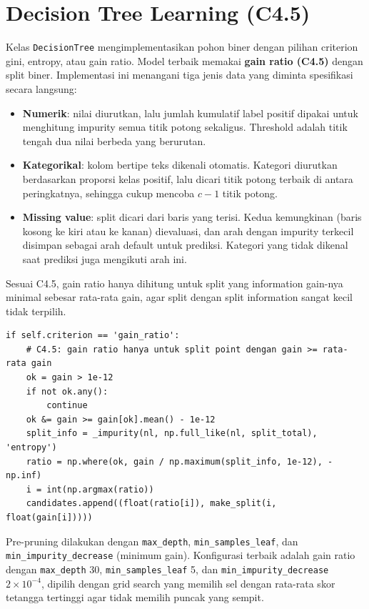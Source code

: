 \section{Decision Tree Learning (C4.5)}
Kelas \texttt{DecisionTree} mengimplementasikan pohon biner dengan pilihan criterion gini, entropy, atau gain ratio. Model terbaik memakai \textbf{gain ratio (C4.5)} dengan split biner. Implementasi ini menangani tiga jenis data yang diminta spesifikasi secara langsung:
\begin{itemize}
  \item \textbf{Numerik}: nilai diurutkan, lalu jumlah kumulatif label positif dipakai untuk menghitung impurity semua titik potong sekaligus. Threshold adalah titik tengah dua nilai berbeda yang berurutan.
  \item \textbf{Kategorikal}: kolom bertipe teks dikenali otomatis. Kategori diurutkan berdasarkan proporsi kelas positif, lalu dicari titik potong terbaik di antara peringkatnya, sehingga cukup mencoba $c-1$ titik potong.
  \item \textbf{Missing value}: split dicari dari baris yang terisi. Kedua kemungkinan (baris kosong ke kiri atau ke kanan) dievaluasi, dan arah dengan impurity terkecil disimpan sebagai arah default untuk prediksi. Kategori yang tidak dikenal saat prediksi juga mengikuti arah ini.
\end{itemize}
Sesuai C4.5, gain ratio hanya dihitung untuk split yang information gain-nya minimal sebesar rata-rata gain, agar split dengan split information sangat kecil tidak terpilih.

\begin{lstlisting}[caption={Pemilihan split dengan gain ratio (diringkas)}, label={lst:gainratio}]
if self.criterion == 'gain_ratio':
    # C4.5: gain ratio hanya untuk split point dengan gain >= rata-rata gain
    ok = gain > 1e-12
    if not ok.any():
        continue
    ok &= gain >= gain[ok].mean() - 1e-12
    split_info = _impurity(nl, np.full_like(nl, split_total), 'entropy')
    ratio = np.where(ok, gain / np.maximum(split_info, 1e-12), -np.inf)
    i = int(np.argmax(ratio))
    candidates.append((float(ratio[i]), make_split(i, float(gain[i]))))
\end{lstlisting}

Pre-pruning dilakukan dengan \texttt{max\_depth}, \texttt{min\_samples\_leaf}, dan \texttt{min\_impurity\_decrease} (minimum gain). Konfigurasi terbaik adalah gain ratio dengan \texttt{max\_depth} 30, \texttt{min\_samples\_leaf} 5, dan \texttt{min\_impurity\_decrease} $2\times10^{-4}$, dipilih dengan grid search yang memilih sel dengan rata-rata skor tetangga tertinggi agar tidak memilih puncak yang sempit.

